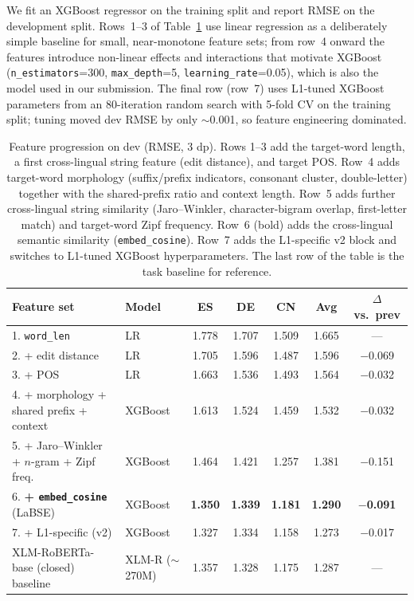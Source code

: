 \documentclass[11pt]{article}
\begin{document}
We fit an XGBoost regressor on the training split and report RMSE on the development split. Rows~1--3 of Table~\ref{tab:feature_progression} use linear regression as a deliberately simple baseline for small, near-monotone feature sets; from row~4 onward the features introduce non-linear effects and interactions that motivate XGBoost (\texttt{n\_estimators}=300, \texttt{max\_depth}=5, \texttt{learning\_rate}=0.05), which is also the model used in our submission. The final row (row~7) uses L1-tuned XGBoost parameters from an 80-iteration random search with 5-fold CV on the training split; tuning moved dev RMSE by only $\sim$0.001, so feature engineering dominated.

\begin{table}[t!]
\centering
\small
\begin{tabular}{llccccc}
\toprule
\textbf{Feature set} & \textbf{Model} & \textbf{ES} & \textbf{DE} & \textbf{CN} & \textbf{Avg} & \textbf{$\Delta$ vs.\ prev} \\
\midrule
1. \texttt{word\_len} & LR & 1.778 & 1.707 & 1.509 & 1.665 & --- \\
2. + edit distance & LR & 1.705 & 1.596 & 1.487 & 1.596 & $-$0.069 \\
3. + POS & LR & 1.663 & 1.536 & 1.493 & 1.564 & $-$0.032 \\
4. + morphology + shared prefix + context & XGBoost & 1.613 & 1.524 & 1.459 & 1.532 & $-$0.032 \\
5. + Jaro--Winkler + $n$-gram + Zipf freq. & XGBoost & 1.464 & 1.421 & 1.257 & 1.381 & $-$0.151 \\
6. \textbf{+ \texttt{embed\_cosine}} (LaBSE) & XGBoost & \textbf{1.350} & \textbf{1.339} & \textbf{1.181} & \textbf{1.290} & \textbf{$-$0.091} \\
7. + L1-specific (v2) & XGBoost\footnotemark & 1.327 & 1.334 & 1.158 & 1.273 & $-$0.017 \\
\midrule
XLM-RoBERTa-base (closed) baseline & XLM-R ($\sim$270M) & 1.357 & 1.328 & 1.175 & 1.287 & --- \\
\bottomrule
\end{tabular}
\caption{Feature progression on dev (RMSE, 3 dp). Rows 1--3 add the target-word length, a first cross-lingual string feature (edit distance), and target POS. Row~4 adds target-word morphology (suffix/prefix indicators, consonant cluster, double-letter) together with the shared-prefix ratio and context length. Row~5 adds further cross-lingual string similarity (Jaro--Winkler, character-bigram overlap, first-letter match) and target-word Zipf frequency. Row~6 (bold) adds the cross-lingual semantic similarity (\texttt{embed\_cosine}). Row~7 adds the L1-specific v2 block and switches to L1-tuned XGBoost hyperparameters. The last row of the table is the task baseline for reference.}
\label{tab:feature_progression}
\end{table}
\end{document}
